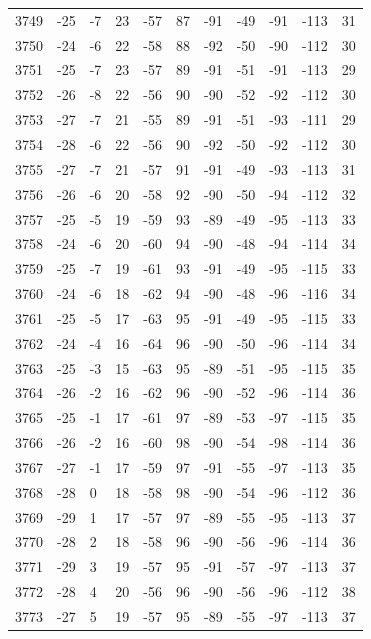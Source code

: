 \begin{table}[H]
\begin{tabular}{lllllllllll}
3749 & -25 & -7 & 23 & -57 & 87 & -91 & -49 & -91 & -113 & 31 \\
3750 & -24 & -6 & 22 & -58 & 88 & -92 & -50 & -90 & -112 & 30 \\
3751 & -25 & -7 & 23 & -57 & 89 & -91 & -51 & -91 & -113 & 29 \\
3752 & -26 & -8 & 22 & -56 & 90 & -90 & -52 & -92 & -112 & 30 \\
3753 & -27 & -7 & 21 & -55 & 89 & -91 & -51 & -93 & -111 & 29 \\
3754 & -28 & -6 & 22 & -56 & 90 & -92 & -50 & -92 & -112 & 30 \\
3755 & -27 & -7 & 21 & -57 & 91 & -91 & -49 & -93 & -113 & 31 \\
3756 & -26 & -6 & 20 & -58 & 92 & -90 & -50 & -94 & -112 & 32 \\
3757 & -25 & -5 & 19 & -59 & 93 & -89 & -49 & -95 & -113 & 33 \\
3758 & -24 & -6 & 20 & -60 & 94 & -90 & -48 & -94 & -114 & 34 \\
3759 & -25 & -7 & 19 & -61 & 93 & -91 & -49 & -95 & -115 & 33 \\
3760 & -24 & -6 & 18 & -62 & 94 & -90 & -48 & -96 & -116 & 34 \\
3761 & -25 & -5 & 17 & -63 & 95 & -91 & -49 & -95 & -115 & 33 \\
3762 & -24 & -4 & 16 & -64 & 96 & -90 & -50 & -96 & -114 & 34 \\
3763 & -25 & -3 & 15 & -63 & 95 & -89 & -51 & -95 & -115 & 35 \\
3764 & -26 & -2 & 16 & -62 & 96 & -90 & -52 & -96 & -114 & 36 \\
3765 & -25 & -1 & 17 & -61 & 97 & -89 & -53 & -97 & -115 & 35 \\
3766 & -26 & -2 & 16 & -60 & 98 & -90 & -54 & -98 & -114 & 36 \\
3767 & -27 & -1 & 17 & -59 & 97 & -91 & -55 & -97 & -113 & 35 \\
3768 & -28 & 0 & 18 & -58 & 98 & -90 & -54 & -96 & -112 & 36 \\
3769 & -29 & 1 & 17 & -57 & 97 & -89 & -55 & -95 & -113 & 37 \\
3770 & -28 & 2 & 18 & -58 & 96 & -90 & -56 & -96 & -114 & 36 \\
3771 & -29 & 3 & 19 & -57 & 95 & -91 & -57 & -97 & -113 & 37 \\
3772 & -28 & 4 & 20 & -56 & 96 & -90 & -56 & -96 & -112 & 38 \\
3773 & -27 & 5 & 19 & -57 & 95 & -89 & -55 & -97 & -113 & 37 \\

\end{tabular}
\end{table}
